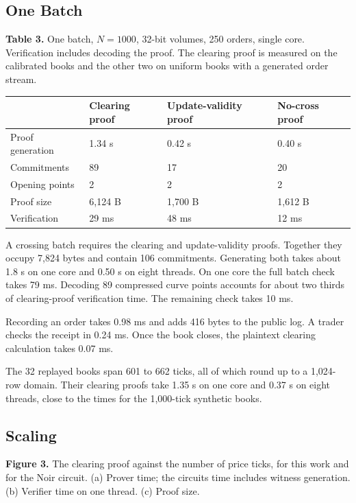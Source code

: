 \subsection{One Batch}

\textbf{Table 3.} One batch, \(N = 1000\), 32-bit volumes, 250 orders, single core. Verification includes decoding the proof. The clearing proof is measured on the calibrated books and the other two on uniform books with a generated order stream.

\begin{longtable}[]{@{}llll@{}}
\toprule\noalign{}
& Clearing proof & Update-validity proof & No-cross proof \\
\midrule\noalign{}
\endhead
\bottomrule\noalign{}
\endlastfoot
Proof generation & 1.34 s & 0.42 s & 0.40 s \\
Commitments & 89 & 17 & 20 \\
Opening points & 2 & 2 & 2 \\
Proof size & 6,124 B & 1,700 B & 1,612 B \\
Verification & 29 ms & 48 ms & 12 ms \\
\end{longtable}

A crossing batch requires the clearing and update-validity proofs. Together they occupy 7,824 bytes and contain 106 commitments. Generating both takes about 1.8 s on one core and 0.50 s on eight threads. On one core the full batch check takes 79 ms. Decoding 89 compressed curve points accounts for about two thirds of clearing-proof verification time. The remaining check takes 10 ms.

Recording an order takes 0.98 ms and adds 416 bytes to the public log. A trader checks the receipt in 0.24 ms. Once the book closes, the plaintext clearing calculation takes 0.07 ms.

The 32 replayed books span 601 to 662 ticks, all of which round up to a 1,024-row domain. Their clearing proofs take 1.35 s on one core and 0.37 s on eight threads, close to the times for the 1,000-tick synthetic books.

\subsection{Scaling}



\textbf{Figure 3.} The clearing proof against the number of price ticks, for this work and for the Noir circuit. (a) Prover time; the circuit\textquotesingle s time includes witness generation. (b) Verifier time on one thread. (c) Proof size.

